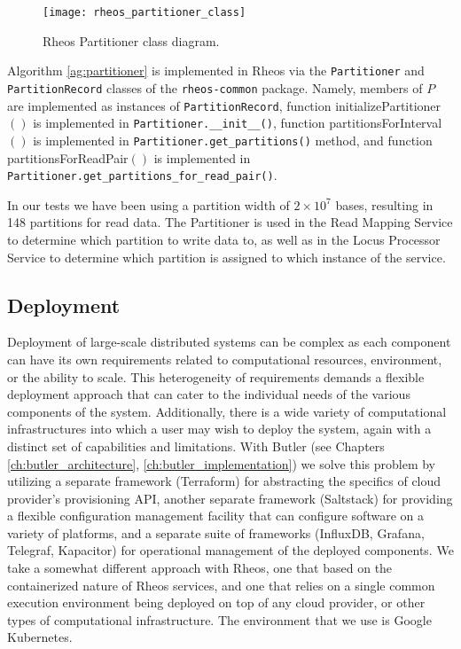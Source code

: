 \begin{figure}[h!]
    \texttt{[image: rheos\_partitioner\_class]}
    \centering
    \caption {Rheos Partitioner class diagram.}
    \label{fig:rheos_partitioner_class}
\end{figure}

Algorithm \ref{ag:partitioner} is implemented in Rheos via the \texttt{Partitioner} and \texttt{PartitionRecord} classes of the \texttt{rheos-common} package. Namely, members of $P$ are implemented as instances of \texttt{PartitionRecord}, function {\sc initializePartitioner}$()$ is implemented in \texttt{Partitioner.__init__()}, function {\sc partitionsForInterval}$()$ is implemented in \texttt{Partitioner.get_partitions()} method, and function {\sc partitionsForReadPair}$()$ is implemented in \\\texttt{Partitioner.get_partitions_for_read_pair()}.

In our tests we have been using a partition width of $2\times10^7$ bases, resulting in 148 partitions for read data. The Partitioner is used in the Read Mapping Service to determine which partition to write data to, as well as in the Locus Processor Service to determine which partition is assigned to which instance of the service.

\subsection{Deployment}

Deployment of large-scale distributed systems can be complex as each component can have its own requirements related to computational resources, environment, or the ability to scale. This heterogeneity of requirements demands a flexible deployment approach that can cater to the individual needs of the various components of the system. Additionally, there is a wide variety of computational infrastructures into which a user may wish to deploy the system, again with a distinct set of capabilities and limitations. With Butler (see Chapters \ref{ch:butler_architecture}, \ref{ch:butler_implementation}) we solve this problem by utilizing a separate framework (Terraform) for abstracting the specifics of cloud provider's provisioning API, another separate framework (Saltstack) for providing a flexible configuration management facility that can configure software on a variety of platforms, and a separate suite of frameworks (InfluxDB, Grafana, Telegraf, Kapacitor) for operational management of the deployed components. We take a somewhat different approach with Rheos, one that based on the containerized nature of Rheos services, and one that relies on a single common execution environment being deployed on top of any cloud provider, or other types of computational infrastructure. The environment that we use is Google Kubernetes\autocite{bernstein2014containers}. 


